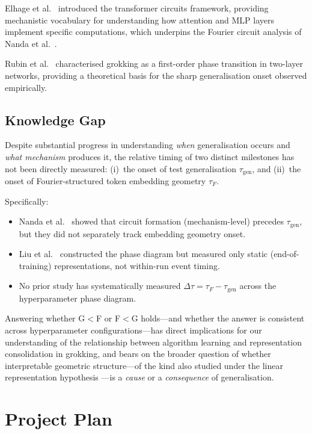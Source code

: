 \documentclass[12pt,openany,a4paper]{book}
\newcommand{\taug}{\tau_{\mathrm{gen}}}
\newcommand{\tauf}{\tau_{F}}
\newcommand{\Dtau}{\Delta\tau}
\begin{document}
Elhage et al.\ \cite{elhage2021mathematical} introduced the
transformer circuits framework, providing mechanistic vocabulary
for understanding how attention and MLP layers implement specific
computations, which underpins the Fourier circuit analysis of
Nanda et al.~\cite{nanda2023progress}.

Rubin et al.\ \cite{rubin2024grokking} characterised grokking as
a first-order phase transition in two-layer networks, providing a
theoretical basis for the sharp generalisation onset observed
empirically.

\section{Knowledge Gap}

Despite substantial progress in understanding \emph{when} generalisation
occurs and \emph{what mechanism} produces it, the relative timing of
two distinct milestones has not been directly measured:
(i)~the onset of test generalisation $\taug$, and
(ii)~the onset of Fourier-structured token embedding geometry $\tauf$.

Specifically:
\begin{itemize}
  \item Nanda et al.\ \cite{nanda2023progress} showed that circuit
    formation (mechanism-level) precedes $\taug$, but they did not
    separately track embedding geometry onset.
  \item Liu et al.\ \cite{liu2022towards} constructed the phase diagram
    but measured only static (end-of-training) representations, not
    within-run event timing.
  \item No prior study has systematically measured $\Dtau = \tauf - \taug$
    across the hyperparameter phase diagram.
\end{itemize}
Answering whether G$<$F or F$<$G holds---and whether the answer is
consistent across hyperparameter configurations---has direct implications
for our understanding of the relationship between algorithm learning
and representation consolidation in grokking, and bears on the broader
question of whether interpretable geometric structure---of the kind
also studied under the linear representation hypothesis
\cite{park2024linear}---is a \emph{cause} or a \emph{consequence} of
generalisation.

\chapter{Project Plan}
\label{chap:plan}
\end{document}
